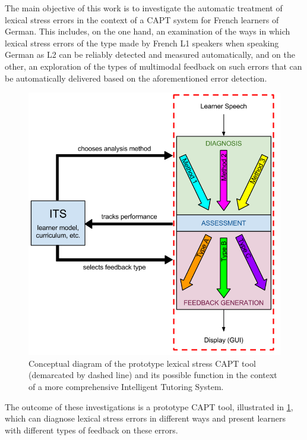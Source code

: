 The main objective of this work is to investigate the automatic treatment of lexical stress errors in the context of a CAPT system for French learners of German. This includes, on the one hand, an examination of the ways in which lexical stress errors of the type made by French L1 speakers when speaking German as L2 can be reliably detected and measured %
automatically, and on the other, an exploration of the types of multimodal feedback on such errors that can be automatically delivered based on the aforementioned error detection. 
%
	\begin{figure}[thb] 
		\centering
		\includegraphics[height=.45\textheight]{img/hourglass-ITS} 
		\caption[Conceptual diagram of the prototype lexical stress CAPT tool]{Conceptual diagram of the prototype lexical stress CAPT tool (demarcated by dashed line) and its possible function in the context of a more comprehensive Intelligent Tutoring System. }
		\label{fig:hourglass-ITS}
	\end{figure}
%
The outcome of these investigations is a prototype CAPT tool, illustrated in \cref{fig:hourglass-ITS},
which can diagnose lexical stress errors in different ways and present learners with different types of feedback on these errors. 



